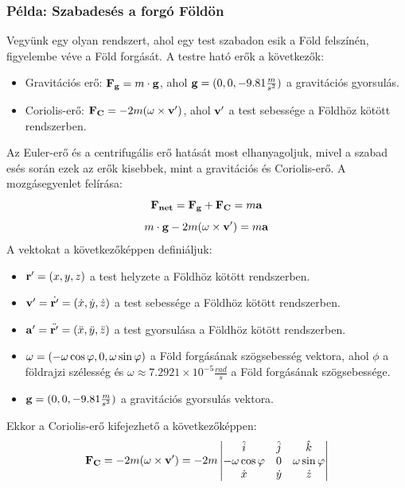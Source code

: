 \documentclass[../main.tex]{subfiles}
\begin{document}
\subsubsection*{Példa: Szabadesés a forgó Földön}
Vegyünk egy olyan rendszert, ahol egy test szabadon esik a Föld felszínén, figyelembe véve a Föld forgását. A testre ható erők a következők:
\begin{itemize}
    \item Gravitációs erő: $\bold{F_g} = m\cdot \bold{g}$, ahol $\bold{g} = (0, 0, -9.81 \frac{m}{s^2})$ a gravitációs gyorsulás.
    \item Coriolis-erő: $\bold{F_{C}} = -2m(\bold{\omega} \times \bold{v'})$, ahol $\bold{v'}$ a test sebessége a Földhöz kötött rendszerben.
\end{itemize}
Az Euler-erő és a centrifugális erő hatását most elhanyagoljuk, mivel a szabad esés során ezek az erők kisebbek, mint a gravitációs és Coriolis-erő. A mozgásegyenlet felírása:
\begin{equation}
    \bold{F_{net}} = \bold{F_g} + \bold{F_{C}} = m\bold{a}
\end{equation}
\begin{equation}
    m\cdot \bold{g} - 2m(\bold{\omega} \times \bold{v'}) = m\bold{a}
\end{equation}
A vektokat a következőképpen definiáljuk:
\begin{itemize}
    \item $\bold{r'} = (x, y, z)$ a test helyzete a Földhöz kötött rendszerben.
    \item $\bold{v'} = \dot{\bold{r'}} = (\dot{x}, \dot{y}, \dot{z})$ a test sebessége a Földhöz kötött rendszerben.
    \item $\bold{a'} = \ddot{\bold{r'}} = (\ddot{x}, \ddot{y}, \ddot{z})$ a test gyorsulása a Földhöz kötött rendszerben.
    \item $\bold{\omega} = (-\omega\cos\varphi, 0, \omega\sin\varphi)$ a Föld forgásának szögsebesség vektora, ahol $\phi$ a földrajzi szélesség és $\omega \approx 7.2921 \times 10^{-5} \frac{rad}{s}$ a Föld forgásának szögsebessége.
    \item $\bold{g} = (0, 0, -9.81 \frac{m}{s^2})$ a gravitációs gyorsulás vektora.
\end{itemize}
Ekkor a Coriolis-erő kifejezhető a következőképpen:
\begin{equation}
    \bold{F_{C}} = -2m(\bold{\omega} \times \bold{v'}) = -2m \begin{vmatrix}
    \hat{i} & \hat{j} & \hat{k} \\
    -\omega\cos\varphi & 0 & \omega\sin\varphi \\
    \dot{x} & \dot{y} & \dot{z}
    \end{vmatrix}
\end{equation}
\end{document}
